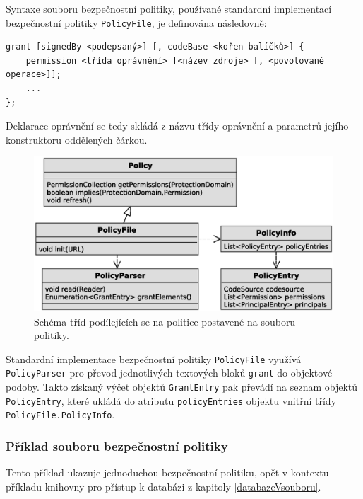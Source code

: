 Syntaxe souboru bezpečnostní politiky, používané standardní implementací bezpečnostní politiky {\tt PolicyFile}, je definována následovně: \cite[5.3.1]{oaks}

\begin{verbatim}
grant [signedBy <podepsaný>] [, codeBase <kořen balíčků>] {
    permission <třída oprávnění> [<název zdroje> [, <povolované operace>]];
    ...
};
\end{verbatim}

Deklarace oprávnění se tedy skládá z názvu třídy oprávnění a parametrů jejího konstruktoru oddělených čárkou.

\begin{figure}[ht]
  \centering
  \includegraphics[width=14cm]{fig/policy-schema}
  \caption{Schéma tříd podílejících se na politice postavené na souboru politiky.}
\end{figure}

Standardní implementace bezpečnostní politiky {\tt PolicyFile} využívá {\tt PolicyParser} pro převod jednotlivých textových bloků {\tt grant} do objektové podoby.
Takto získaný výčet objektů {\tt GrantEntry} pak převádí na seznam objektů {\tt PolicyEntry}, které ukládá do atributu {\tt policyEntries} objektu vnitřní třídy {\tt PolicyFile.PolicyInfo}.

\subsubsection{Příklad souboru bezpečnostní politiky}

Tento příklad ukazuje jednoduchou bezpečnostní politiku, opět v kontextu příkladu knihovny pro přístup k databázi z kapitoly \ref{databazeVsouboru}.

